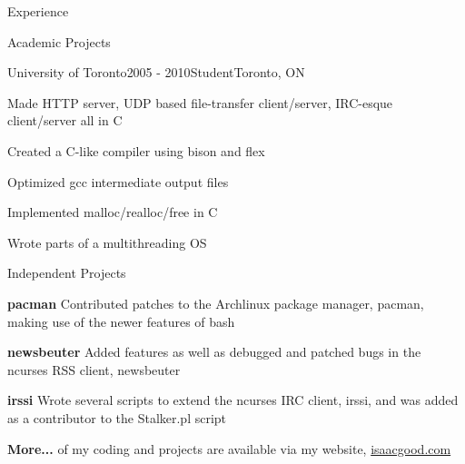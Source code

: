 \documentclass{resume}
\begin{document}
\begin{rSection}{Experience}
  \end{rSection}

  \begin{rSection}{Academic Projects}
    \begin{rSubsection}{University of Toronto}{2005 - 2010}{Student}{Toronto, ON}
      \item Made HTTP server, UDP based file-transfer client/server, IRC-esque client/server all in C
      \item Created a C-like compiler using bison and flex
      \item Optimized gcc intermediate output files
      \item Implemented malloc/realloc/free in C
      \item Wrote parts of a multithreading OS
    \end{rSubsection}
  \end{rSection}

  \begin{rSection}{Independent Projects}
    \begin{rSubsection}{}{}{}{}
      \item \textbf{pacman} Contributed patches to the Archlinux package manager, pacman, making use of the newer features of bash
      \item \textbf{newsbeuter} Added features as well as debugged and patched bugs in the ncurses RSS client, newsbeuter
      \item \textbf{irssi} Wrote several scripts to extend the ncurses IRC client, irssi, and was added as a contributor to the Stalker.pl script
      \item \textbf{More...} of my coding and projects are available via my website, \href{http://www.isaacgood.com/}{isaacgood.com}
    \end{rSubsection}
  \end{rSection}
\end{document}
